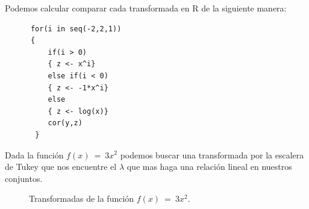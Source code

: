 \documentclass[]{article}
\begin{document}
Podemos calcular comparar cada transformada en R de la siguiente manera:
  \begin{lstlisting}
      for(i in seq(-2,2,1))
      {
          if(i > 0)
          { z <- x^i}
          else if(i < 0)
          { z <- -1*x^i}
          else
          { z <- log(x)}
          cor(y,z)
       }
   \end{lstlisting}

Dada la función $f\left(x\right)\ =\ 3x^2$ podemos buscar una transformada por la escalera de Tukey que nos encuentre el $\lambda$ que mas haga una relación lineal en nuestros conjuntos.



\begin{figure}[hbt!]
\centering
{}%
\hfill
{}%
\hfill
{}%
\hfill
{}%
\hfill
{}%
\hfill
{}%
\hfill
\caption{Transformadas de la función $f\left(x\right)\ =\ 3x^2$.}


\end{figure}
\end{document}
